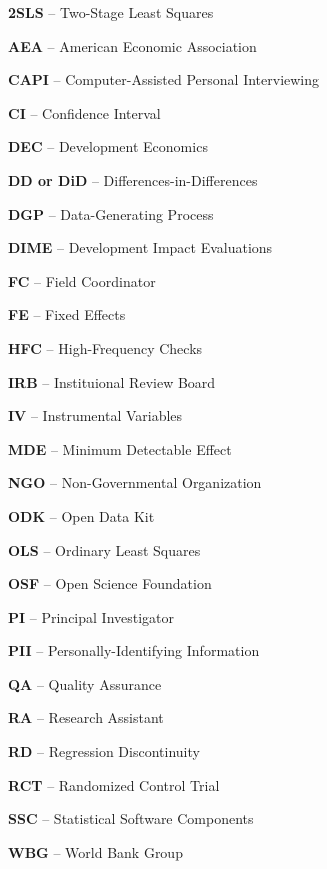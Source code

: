 \noindent\textbf{2SLS} -- Two-Stage Least Squares

\noindent\textbf{AEA} -- American Economic Association

\noindent\textbf{CAPI} -- Computer-Assisted Personal Interviewing

\noindent\textbf{CI} -- Confidence Interval

\noindent\textbf{DEC} -- Development Economics

\noindent\textbf{DD or DiD} -- Differences-in-Differences

\noindent\textbf{DGP} -- Data-Generating Process

\noindent\textbf{DIME} -- Development Impact Evaluations

\noindent\textbf{FC} -- Field Coordinator

\noindent\textbf{FE} -- Fixed Effects

\noindent\textbf{HFC} -- High-Frequency Checks

\noindent\textbf{IRB} -- Instituional Review Board

\noindent\textbf{IV} -- Instrumental Variables

\noindent\textbf{MDE} -- Minimum Detectable Effect

\noindent\textbf{NGO} -- Non-Governmental Organization

\noindent\textbf{ODK} -- Open Data Kit

\noindent\textbf{OLS} -- Ordinary Least Squares

\noindent\textbf{OSF} -- Open Science Foundation

\noindent\textbf{PI} -- Principal Investigator

\noindent\textbf{PII} -- Personally-Identifying Information

\noindent\textbf{QA} -- Quality Assurance

\noindent\textbf{RA} -- Research Assistant

\noindent\textbf{RD} -- Regression Discontinuity

\noindent\textbf{RCT} -- Randomized Control Trial

\noindent\textbf{SSC} -- Statistical Software Components

\noindent\textbf{WBG} -- World Bank Group
